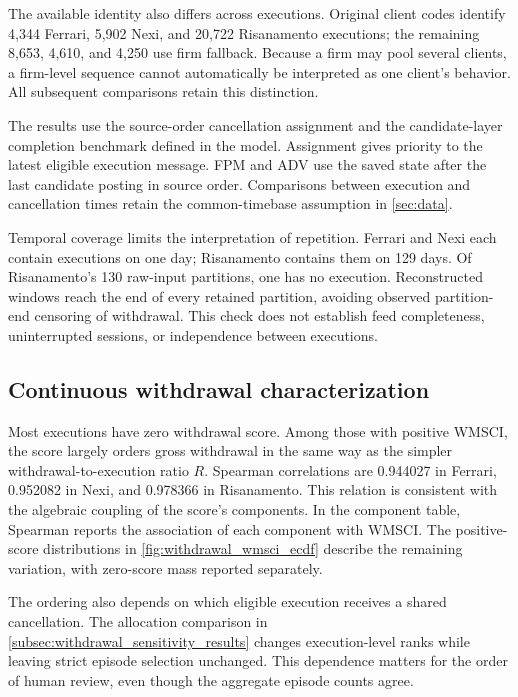 \documentclass[11pt]{article}
\begin{document}


The available identity also differs across executions. Original client codes identify 4,344 Ferrari, 5,902 Nexi, and 20,722 Risanamento executions; the remaining 8,653, 4,610, and 4,250 use firm fallback. Because a firm may pool several clients, a firm-level sequence cannot automatically be interpreted as one client's behavior. All subsequent comparisons retain this distinction.

The results use the source-order cancellation assignment and the candidate-layer completion benchmark defined in the model. Assignment gives priority to the latest eligible execution message. FPM and ADV use the saved state after the last candidate posting in source order. Comparisons between execution and cancellation times retain the common-timebase assumption in \cref{sec:data}.

Temporal coverage limits the interpretation of repetition. Ferrari and Nexi each contain executions on one day; Risanamento contains them on 129 days. Of Risanamento's 130 raw-input partitions, one has no execution. Reconstructed windows reach the end of every retained partition, avoiding observed partition-end censoring of withdrawal. This check does not establish feed completeness, uninterrupted sessions, or independence between executions.
\FloatBarrier

\subsection{Continuous withdrawal characterization}
\label{subsec:continuous_withdrawal_results}

Most executions have zero withdrawal score. Among those with positive WMSCI, the score largely orders gross withdrawal in the same way as the simpler withdrawal-to-execution ratio $R$. Spearman correlations are 0.944027 in Ferrari, 0.952082 in Nexi, and 0.978366 in Risanamento. This relation is consistent with the algebraic coupling of the score's components. In the component table, Spearman reports the association of each component with WMSCI. The positive-score distributions in \cref{fig:withdrawal_wmsci_ecdf} describe the remaining variation, with zero-score mass reported separately.

The ordering also depends on which eligible execution receives a shared cancellation. The allocation comparison in \cref{subsec:withdrawal_sensitivity_results} changes execution-level ranks while leaving strict episode selection unchanged. This dependence matters for the order of human review, even though the aggregate episode counts agree.
\end{document}
